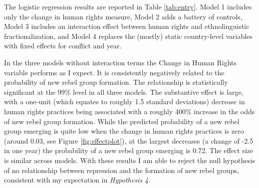 \documentclass[12pt,]{book}
\theoremstyle{definition}
\theoremstyle{definition}
\theoremstyle{remark}
\begin{document}
The logistic regression results are reported in Table \ref{tab:entry}.
Model 1 includes only the change in human rights measure, Model 2 adds a
battery of controls, Model 3 includes an interaction effect between
human rights and ethnolinguistic fractionalization, and Model 4 replaces
the (mostly) static country-level variables with fixed effects for
conflict and year.

In the three models without interaction terms the Change in Human Rights
variable performs as I expect. It is consistently negatively related to
the probability of new rebel group formation. The relationship is
statistically significant at the 99\% level in all three models. The
substantive effect is large, with a one-unit (which equates to roughly
1.5 standard deviations) decrease in human rights practices being
associated with a roughly 400\% increase in the odds of new rebel group
formation. While the predicted probability of a new rebel group emerging
is quite low when the change in human rights practices is zero (around
0.03, see Figure \ref{fig:effectplot}), at the largest decreases (a
change of -2.5 in one year) the probability of a new rebel group
emerging is 0.72. The effect size is similar across models. With these
results I am able to reject the null hypothesis of no relationship
between repression and the formation of new rebel groups, consistent
with my expectation in \emph{Hypothesis 4}.
\end{document}
